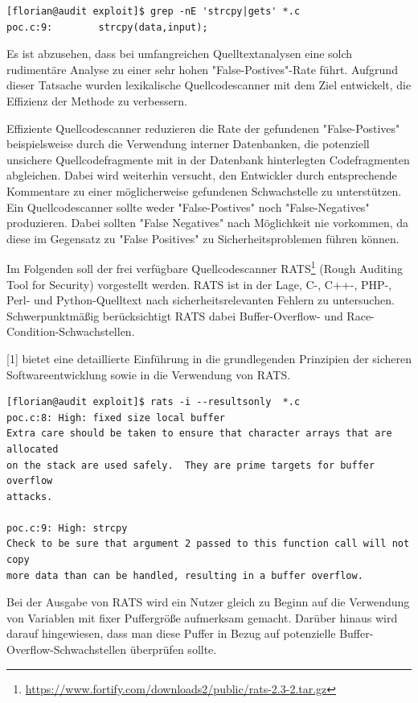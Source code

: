 \begin{lstlisting}[basicstyle=\ttfamily\footnotesize]
[florian@audit exploit]$ grep -nE 'strcpy|gets' *.c
poc.c:9:        strcpy(data,input);
\end{lstlisting}

Es ist abzusehen, dass bei umfangreichen Quelltextanalysen eine solch 
rudimentäre Analyse zu einer sehr hohen "False-Postives"-Rate führt. 
Aufgrund dieser Tatsache wurden lexikalische Quellcodescanner mit dem 
Ziel entwickelt, die Effizienz der Methode zu verbessern.

Effiziente Quellcodescanner reduzieren die Rate der gefundenen 
"False-Postives" beispielsweise durch die Verwendung interner 
Datenbanken, die  potenziell unsichere Quellcodefragmente mit in 
der Datenbank hinterlegten Codefragmenten abgleichen. Dabei wird 
weiterhin versucht, den Entwickler durch entsprechende Kommentare zu 
einer möglicherweise gefundenen Schwachstelle zu unterstützen. Ein 
Quellcodescanner sollte weder "False-Postives" noch "False-Negatives" 
produzieren. Dabei sollten "False Negatives" nach Möglichkeit nie 
vorkommen, da diese im Gegensatz zu "False Positives" zu 
Sicherheitsproblemen führen können.

Im Folgenden soll der frei verfügbare Quellcodescanner RATS\footnote{\url{https://www.fortify.com/downloads2/public/rats-2.3-2.tar.gz}} 
(Rough Auditing Tool for Security) vorgestellt werden. RATS ist in der 
Lage, C-, C++-, PHP-, Perl- und Python-Quelltext nach 
sicherheitsrelevanten Fehlern zu untersuchen. Schwerpunktmäßig 
berücksichtigt RATS dabei Buffer-Overflow- und Race-Condition-Schwachstellen.

[1] bietet eine detaillierte Einführung in die grundlegenden Prinzipien 
der sicheren Softwareentwicklung sowie in die Verwendung von RATS.

\begin{lstlisting}[basicstyle=\ttfamily\footnotesize]
[florian@audit exploit]$ rats -i --resultsonly  *.c
poc.c:8: High: fixed size local buffer
Extra care should be taken to ensure that character arrays that are allocated
on the stack are used safely.  They are prime targets for buffer overflow
attacks.

poc.c:9: High: strcpy
Check to be sure that argument 2 passed to this function call will not copy
more data than can be handled, resulting in a buffer overflow.
\end{lstlisting}

Bei der Ausgabe von RATS wird ein Nutzer gleich zu Beginn auf die 
Verwendung von Variablen mit fixer Puffergröße aufmerksam gemacht. 
Darüber hinaus wird darauf hingewiesen, dass man diese Puffer in 
Bezug auf potenzielle Buffer-Overflow-Schwachstellen überprüfen sollte.

